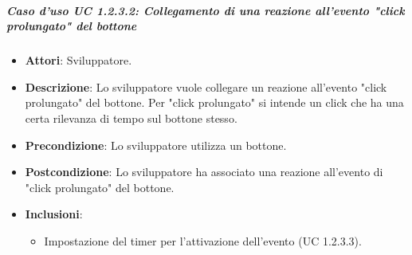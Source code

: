 \subparagraph{Caso d'uso UC 1.2.3.2: Collegamento di una reazione all'evento "click prolungato" del bottone}

\FloatBarrier
\begin{itemize}
\item\textbf{Attori}: Sviluppatore.
\item\textbf{Descrizione}: Lo sviluppatore vuole collegare un reazione all'evento "click prolungato" del bottone. Per "click prolungato" si intende un click che ha una certa rilevanza di tempo sul bottone stesso.
\item\textbf{Precondizione}: Lo sviluppatore utilizza un bottone.
\item\textbf{Postcondizione}: Lo sviluppatore ha associato una reazione all'evento di "click prolungato" del bottone.
\item \textbf{Inclusioni}:
\begin{itemize}
\item Impostazione del timer per l'attivazione dell'evento (UC 1.2.3.3).
\end{itemize} 
\end{itemize}
